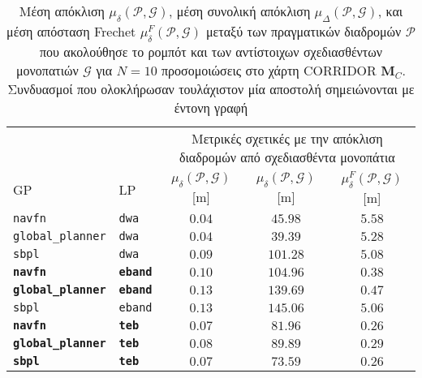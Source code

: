 \begin{table}[h]\hspace{-1.5cm}
\renewcommand{\arraystretch}{1.3}
\begin{tabular}{llccc}
  & & \multicolumn{3}{c}{Μετρικές σχετικές με την απόκλιση διαδρομών από σχεδιασθέντα μονοπάτια} \\
  \cline{3-5}
  GP & LP & $\mu_{\delta}(\bm{\mathcal{P}},\bm{\mathcal{G}})$ [m] & $\mu_{\delta}(\bm{\mathcal{P}},\bm{\mathcal{G}})$ [m] & $\mu_{\delta}^F(\bm{\mathcal{P}},\bm{\mathcal{G}})$ [m] \\ \toprule
  \texttt{navfn} & \texttt{dwa} & $0.04$ & $45.98$ & $5.58$ \\
  \texttt{global\_planner} & \texttt{dwa} & $0.04$ & $39.39$ & $5.28$ \\
  \texttt{sbpl} & \texttt{dwa} & $0.09$ & $101.28$ & $5.08$ \\
  \textbf{\texttt{navfn}} & \textbf{\texttt{eband}} & $\bm{0.10}$ & $\bm{104.96}$ & $\bm{0.38}$ \\
  \textbf{\texttt{global\_planner}} & \textbf{\texttt{eband}} & $\bm{0.13}$ & $\bm{139.69}$ & $\bm{0.47}$ \\
  \texttt{sbpl} & \texttt{eband} & $0.13$ & $145.06$ & $5.06$ \\
  \textbf{\texttt{navfn}} & \textbf{\texttt{teb}} & $\bm{0.07}$ & $\bm{81.96}$ & $\bm{0.26}$ \\
  \textbf{\texttt{global\_planner}} & \textbf{\texttt{teb}} & $\bm{0.08}$ & $\bm{89.89}$ & $\bm{0.29}$ \\
  \textbf{\texttt{sbpl}} & \textbf{\texttt{teb}} & $\bm{0.07}$ & $\bm{73.59}$ & $\bm{0.26}$ \\ \bottomrule
\end{tabular}
\caption{\small Μέση απόκλιση $\mu_{\delta}(\bm{\mathcal{P}},\bm{\mathcal{G}})$,
         μέση συνολική απόκλιση
         $\mu_{\Delta}(\bm{\mathcal{P}},\bm{\mathcal{G}})$, και μέση απόσταση
         Frechet $\mu_{\delta}^F(\bm{\mathcal{P}},\bm{\mathcal{G}})$ μεταξύ των
         πραγματικών διαδρομών $\bm{\mathcal{P}}$ που ακολούθησε το ρομπότ και
         των αντίστοιχων σχεδιασθέντων μονοπατιών $\bm{\mathcal{G}}$ για $N=10$
         προσομοιώσεις στο χάρτη CORRIDOR $\bm{M}_C$. Συνδυασμοί που
         ολοκλήρωσαν τουλάχιστον μία αποστολή σημειώνονται με έντονη γραφή}
\label{tbl:info_deviation_from_global_plan_corridor}
\end{table}




